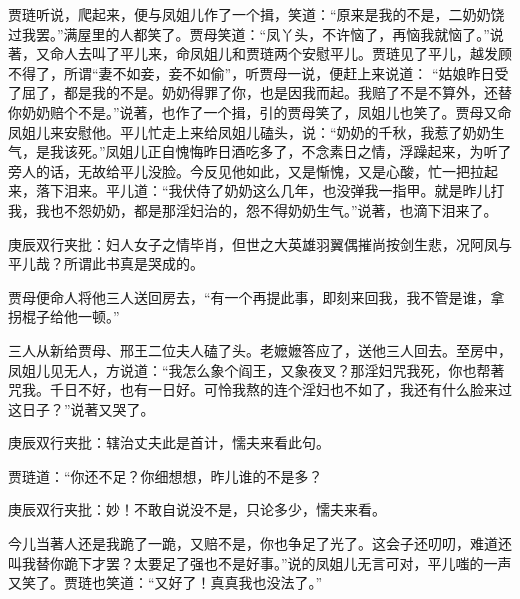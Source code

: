 \begin{parag}
    贾琏听说，爬起来，便与凤姐儿作了一个揖，笑道：“原来是我的不是，二奶奶饶过我罢。”满屋里的人都笑了。贾母笑道：“凤丫头，不许恼了，再恼我就恼了。”说著，又命人去叫了平儿来，命凤姐儿和贾琏两个安慰平儿。贾琏见了平儿，越发顾不得了，所谓“妻不如妾，妾不如偷”，听贾母一说，便赶上来说道： “姑娘昨日受了屈了，都是我的不是。奶奶得罪了你，也是因我而起。我赔了不是不算外，还替你奶奶赔个不是。”说著，也作了一个揖，引的贾母笑了，凤姐儿也笑了。贾母又命凤姐儿来安慰他。平儿忙走上来给凤姐儿磕头，说：“奶奶的千秋，我惹了奶奶生气，是我该死。”凤姐儿正自愧悔昨日酒吃多了，不念素日之情，浮躁起来，为听了旁人的话，无故给平儿没脸。今反见他如此，又是惭愧，又是心酸，忙一把拉起来，落下泪来。平儿道：“我伏侍了奶奶这么几年，也没弹我一指甲。就是昨儿打我，我也不怨奶奶，都是那淫妇治的，怨不得奶奶生气。”说著，也滴下泪来了。\begin{note}庚辰双行夹批：妇人女子之情毕肖，但世之大英雄羽翼偶摧尚按剑生悲，况阿凤与平儿哉？所谓此书真是哭成的。\end{note}贾母便命人将他三人送回房去，“有一个再提此事，即刻来回我，我不管是谁，拿拐棍子给他一顿。”
\end{parag}


\begin{parag}
    三人从新给贾母、邢王二位夫人磕了头。老嬷嬷答应了，送他三人回去。至房中，凤姐儿见无人，方说道：“我怎么象个阎王，又象夜叉？那淫妇咒我死，你也帮著咒我。千日不好，也有一日好。可怜我熬的连个淫妇也不如了，我还有什么脸来过这日子？”说著又哭了。\begin{note}庚辰双行夹批：辖治丈夫此是首计，懦夫来看此句。\end{note}贾琏道：“你还不足？你细想想，昨儿谁的不是多？\begin{note}庚辰双行夹批：妙！不敢自说没不是，只论多少，懦夫来看。\end{note}今儿当著人还是我跪了一跪，又赔不是，你也争足了光了。这会子还叨叨，难道还叫我替你跪下才罢？太要足了强也不是好事。”说的凤姐儿无言可对，平儿嗤的一声又笑了。贾琏也笑道：“又好了！真真我也没法了。”
\end{parag}



